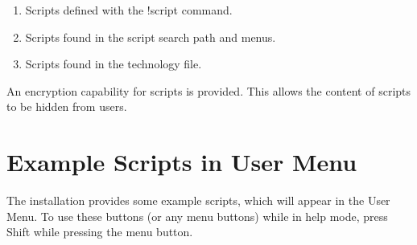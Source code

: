 \begin{enumerate}
\item{Scripts defined with the {\cb !script} command.}
\item{Scripts found in the script search path and menus.}
\item{Scripts found in the technology file.}
\end{enumerate}

An encryption capability for scripts is provided.  This allows the
content of scripts to be hidden from users.

\section{Example Scripts in User Menu}
The {\Xic} installation provides some example scripts, which will
appear in the {\cb User Menu}.  To use these buttons (or any menu
buttons) while in help mode, press {\kb Shift} while pressing the
menu button.

